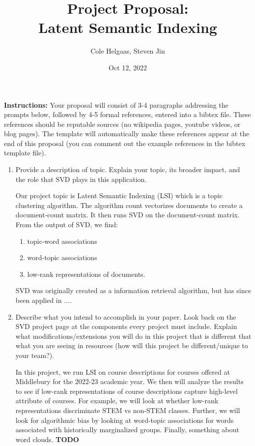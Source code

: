 \documentclass[11pt]{article}
\title{Project Proposal: \\ Latent Semantic Indexing}
\author{Cole Helgaas, Steven Jin}
\date{Oct 12, 2022}
\begin{document}
\maketitle
\textbf{Instructions:} Your proposal will consist of 3-4 paragraphs addressing the prompts below, followed by 4-5 formal references, entered into a bibtex file.
These references should be reputable sources (no wikipedia pages, youtube videos, or blog pages).
The template will automatically make these references appear at the end of this proposal (you can comment out the example references in the bibtex template file).
\begin{enumerate}
	\item Provide a description of topic.
    Explain your topic, its broader impact, and the role that SVD plays in this application.

    Our project topic is Latent Semantic Indexing (LSI) which is a topic clustering algorithm.
    The algorithm count vectorizes documents to create a document-count matrix.
    It then runs SVD on the document-count matrix.
    From the output of SVD, we find:
    \begin{enumerate}
      \item topic-word associations
      \item word-topic associations
      \item low-rank representations of documents.
    \end{enumerate}
    

    SVD was originally created as a information retrieval algorithm, but has since been applied in ....

	\item Describe what you intend to accomplish in your paper.
    Look back on the SVD project page at the components every project must include.
    Explain what modifications/extensions you will do in this project that is different that what you are seeing in resources (how will this project be different/unique to your team?).

    In this project, we run LSI on course descriptions for courses offered at Middlebury for the 2022-23 academic year.
    We then will analyze the results to see if low-rank representations of course descriptions capture high-level attribute of courses.
    For example, we will look at whether low-rank representations discriminate STEM vs non-STEM classes.
    Further, we will look for algorithmic bias by looking at word-topic associations for words associated with historically marginalized groups.
    Finally, something about word clouds. \textbf{TODO}


\end{enumerate}
\end{document}
